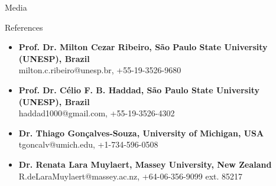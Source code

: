 \documentclass{resume}
\begin{document}
\begin{rSection}{Media}
\end{rSection}


\begin{rSection}{References}
\begin{itemize}
\item {\bf Prof. Dr. Milton Cezar Ribeiro, São Paulo State University (UNESP), Brazil} 
\\ milton.c.ribeiro@unesp.br, +55-19-3526-9680
\item {\bf Prof. Dr. Célio F. B. Haddad, São Paulo State University (UNESP), Brazil} 
\\ haddad1000@gmail.com, +55-19-3526-4302
\item {\bf Dr. Thiago Gonçalves-Souza, University of Michigan, USA} 
\\ tgoncalv@umich.edu, +1-734-596-0508
\item {\bf Dr. Renata Lara Muylaert, Massey University, New Zealand} 
\\ R.deLaraMuylaert@massey.ac.nz, +64-06-356-9099 ext. 85217
\end{itemize}
\end{rSection}
\end{document}
